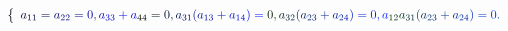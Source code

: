 \documentclass[12pt]{article}
\begin{document}
\makeatletter
\renewcommand*{\@textcolor}[3]{%
  \protect\leavevmode
  \begingroup
    \color#1{#2}#3%
  \endgroup
}
\makeatother
\begin{displaymath}
\mathcolor[RGB]{0,0,15}{\left\{} \begin{array} {l} \mathcolor[RGB]{0,0,30}{\textstyle} { \mathcolor[RGB]{0,0,45}{a} _ { \mathcolor[RGB]{0,0,60}{1} \mathcolor[RGB]{0,0,75}{1} } \mathcolor[RGB]{0,0,90}{=} \mathcolor[RGB]{0,0,105}{a} _ { \mathcolor[RGB]{0,0,120}{2} \mathcolor[RGB]{0,0,135}{2} } \mathcolor[RGB]{0,0,150}{=} \mathcolor[RGB]{0,0,165}{0} \mathcolor[RGB]{0,0,180}{,} \mathcolor[RGB]{0,0,195}{a} _ { \mathcolor[RGB]{0,0,210}{3} \mathcolor[RGB]{0,0,225}{3} } \mathcolor[RGB]{0,0,240}{+} \mathcolor[RGB]{0,0,255}{a} _ { \mathcolor[RGB]{0,15,0}{4} \mathcolor[RGB]{0,15,15}{4} } \mathcolor[RGB]{0,15,30}{=} \mathcolor[RGB]{0,15,45}{0} \mathcolor[RGB]{0,15,60}{,} \mathcolor[RGB]{0,15,75}{a} _ { \mathcolor[RGB]{0,15,90}{3} \mathcolor[RGB]{0,15,105}{1} } \mathcolor[RGB]{0,15,120}{(} \mathcolor[RGB]{0,15,135}{a} _ { \mathcolor[RGB]{0,15,150}{1} \mathcolor[RGB]{0,15,165}{3} } \mathcolor[RGB]{0,15,180}{+} \mathcolor[RGB]{0,15,195}{a} _ { \mathcolor[RGB]{0,15,210}{1} \mathcolor[RGB]{0,15,225}{4} } \mathcolor[RGB]{0,15,240}{)} \mathcolor[RGB]{0,15,255}{=} \mathcolor[RGB]{0,30,0}{0} \mathcolor[RGB]{0,30,15}{,} \mathcolor[RGB]{0,30,30}{a} _ { \mathcolor[RGB]{0,30,45}{3} \mathcolor[RGB]{0,30,60}{2} } \mathcolor[RGB]{0,30,75}{(} \mathcolor[RGB]{0,30,90}{a} _ { \mathcolor[RGB]{0,30,105}{2} \mathcolor[RGB]{0,30,120}{3} } \mathcolor[RGB]{0,30,135}{+} \mathcolor[RGB]{0,30,150}{a} _ { \mathcolor[RGB]{0,30,165}{2} \mathcolor[RGB]{0,30,180}{4} } \mathcolor[RGB]{0,30,195}{)} \mathcolor[RGB]{0,30,210}{=} \mathcolor[RGB]{0,30,225}{0} \mathcolor[RGB]{0,30,240}{,} \mathcolor[RGB]{0,30,255}{a} _ { \mathcolor[RGB]{0,45,0}{1} \mathcolor[RGB]{0,45,15}{2} } \mathcolor[RGB]{0,45,30}{a} _ { \mathcolor[RGB]{0,45,45}{3} \mathcolor[RGB]{0,45,60}{1} } \mathcolor[RGB]{0,45,75}{(} \mathcolor[RGB]{0,45,90}{a} _ { \mathcolor[RGB]{0,45,105}{2} \mathcolor[RGB]{0,45,120}{3} } \mathcolor[RGB]{0,45,135}{+} \mathcolor[RGB]{0,45,150}{a} _ { \mathcolor[RGB]{0,45,165}{2} \mathcolor[RGB]{0,45,180}{4} } \mathcolor[RGB]{0,45,195}{)} \mathcolor[RGB]{0,45,210}{=} \mathcolor[RGB]{0,45,225}{0} \mathcolor[RGB]{0,45,240}{.} } \end{array} \mathcolor[RGB]{0,45,255}{\right.}
\end{displaymath}
\end{document}
